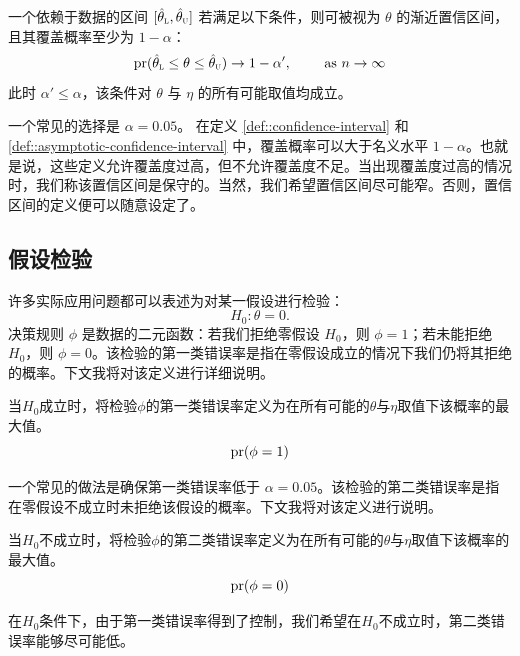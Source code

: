 \begin{definition}
[渐近置信区间]\label{def::asymptotic-confidence-interval}
一个依赖于数据的区间 $[  \hat\theta_\textsc{l} , \hat\theta_\textsc{u} ] $ 若满足以下条件，则可被视为 $\theta$ 的渐近置信区间，且其覆盖概率至少为 $1-\alpha$：
$$
\textup{pr}(    \hat\theta_\textsc{l}   \leq \theta \leq  \hat\theta_\textsc{u}  )   \rightarrow    1-\alpha'   ,\qquad \text{ as } n\rightarrow \infty
$$
此时 $\alpha '  \leq \alpha$，该条件对 $\theta$ 与 $\eta$ 的所有可能取值均成立。     
\end{definition}


一个常见的选择是 $\alpha = 0.05$。  
在定义 \ref{def::confidence-interval} 和 \ref{def::asymptotic-confidence-interval} 中，覆盖概率可以大于名义水平 $1-\alpha$。也就是说，这些定义允许覆盖度过高，但不允许覆盖度不足。当出现覆盖度过高的情况时，我们称该置信区间是保守的。当然，我们希望置信区间尽可能窄。否则，置信区间的定义便可以随意设定了。 



\subsection{假设检验}


  许多实际应用问题都可以表述为对某一假设进行检验：
  $$
  H_0: \theta = 0 .
  $$
决策规则 $\phi$ 是数据的二元函数：若我们拒绝零假设 $H_0$，则 $\phi = 1$；若未能拒绝 $H_0$，则 $\phi = 0$。该检验的第一类错误率是指在零假设成立的情况下我们仍将其拒绝的概率。下文我将对该定义进行详细说明。 


\begin{definition}[第一类错误率]
\label{def::size-test}
当$H_0$成立时，将检验$\phi$的第一类错误率定义为在所有可能的$\theta$与$\eta$取值下该概率的最大值。
$$
\textup{pr}(\phi = 1)
$$     
\end{definition}
  

一个常见的做法是确保第一类错误率低于 $\alpha = 0.05$。该检验的第二类错误率是指在零假设不成立时未拒绝该假设的概率。下文我将对该定义进行说明。 


\begin{definition}[第二类错误率]
\label{def::type2-error-test}
当$H_0$不成立时，将检验$\phi$的第二类错误率定义为在所有可能的$\theta$与$\eta$取值下该概率的最大值。$$
\textup{pr}(\phi = 0)
$$     
\end{definition}


在$H_0$条件下，由于第一类错误率得到了控制，我们希望在$H_0$不成立时，第二类错误率能够尽可能低。 






